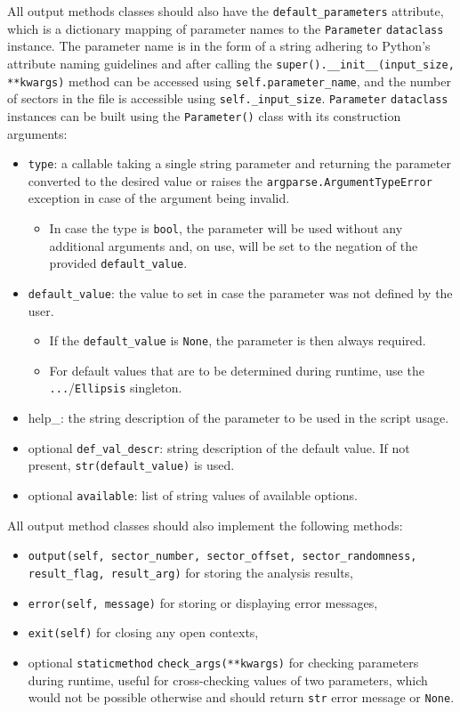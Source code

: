 \documentclass[
  digital, %
  color,   %
  oneside, %
  lof,     %
  nolot,     %
]{fithesis4}
\begin{document}
All output methods classes should also have the \texttt{default\_parameters} attribute, which is a dictionary mapping of parameter names to the \texttt{Parameter} \texttt{dataclass} instance.
The parameter name is in the form of a string adhering to Python's attribute naming guidelines and after calling the \texttt{super().\_\_init\_\_(input\_size, **kwargs)} method can be accessed using \texttt{self.parameter\_name}, and the number of sectors in the file is accessible using \texttt{self.\_input\_size}. \texttt{Parameter} \texttt{dataclass} instances can be built using the \texttt{Parameter()} class with its construction arguments:
\begin{itemize}
  \item \texttt{type}: a callable taking a single string parameter and returning the parameter converted to the desired value or raises the \texttt{argparse.ArgumentTypeError} exception in case of the argument being invalid.
    \begin{itemize}
      \item In case the type is \texttt{bool}, the parameter will be used without any additional arguments and, on use, will be set to the negation of the provided \texttt{default\_value}.
    \end{itemize}
  \item \texttt{default\_value}: the value to set in case the parameter was not defined by the user.
    \begin{itemize}
      \item If the \texttt{default\_value} is \texttt{None}, the parameter is then always required.
      \item For default values that are to be determined during runtime, use the \texttt{...}/\texttt{Ellipsis} singleton.
    \end{itemize}
  \item help\_: the string description of the parameter to be used in the script usage.
  \item optional \texttt{def\_val\_descr}: string description of the default value. 
    If not present, \texttt{str(default\_value)} is used.
  \item optional \texttt{available}: list of string values of available options.
\end{itemize}

All output method classes should also implement the following methods:
\begin{itemize}
    \item \texttt{output(self, sector\_number, sector\_offset, sector\_randomness, result\_flag, result\_arg)} for storing the analysis results,
    \item \texttt{error(self, message)} for storing or displaying error messages,
    \item \texttt{exit(self)} for closing any open contexts,
    \item optional \texttt{staticmethod} \texttt{check\_args(**kwargs)} for checking parameters during runtime, useful for cross-checking values of two parameters, which would not be possible otherwise and should return \texttt{str} error message or \texttt{None}.
\end{itemize}
\end{document}
